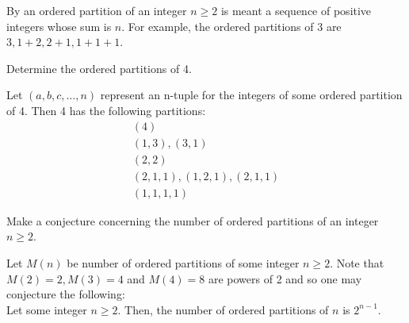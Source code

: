 \documentclass[12pt]{article}
\newenvironment{problem}[2][Problem]{\begin{trivlist}
		\item[\hskip \labelsep {\bfseries #1}\hskip \labelsep {\bfseries #2.}]}{\end{trivlist}}
\newenvironment{solution}[2][Solution]{\begin{trivlist}
		\item[\hskip \labelsep {\bfseries #1}\hskip \labelsep {\bfseries #2.}]}{\end{trivlist}}
\begin{document}
	\begin{problem}{5}
		By an ordered partition of an integer $n\geq 2$ is meant a sequence of positive integers whose sum is $n$. For example, the ordered partitions of 3 are $3,1+2,2+1,1+1+1$.
		\begin{enumerate}[label=(\alph*)]
			\item Determine the ordered partitions of 4.
			\begin{solution}{a}
				Let $(a,b,c,\ldots,n)$ represent an n-tuple for the integers of some ordered partition of 4. Then 4 has the following partitions:
				\begin{align*}
					(4)\\
					(1,3), (3,1)\\
					(2,2)\\
					(2,1,1), (1,2,1), (2,1,1)\\
					(1,1,1,1)
				\end{align*}
				
			\end{solution}
			\item Make a conjecture concerning the number of ordered partitions of an integer $n\geq 2$.
			\begin{solution}{b}
				Let $M(n)$ be number of ordered partitions of some integer $n\geq 2$. Note that $M(2) = 2, M(3) = 4$ and $M(4) = 8$ are powers of 2 and so one may conjecture the following:\\
				 Let some integer $n\geq 2$. Then, the number of ordered partitions of $n$ is $2^{n-1}$.		
			\end{solution}
		\end{enumerate}
	\end{problem}
\end{document}
